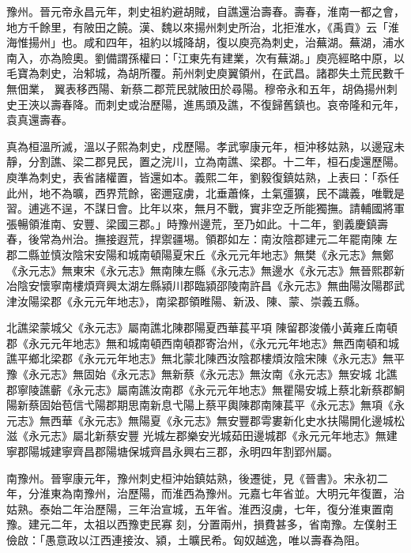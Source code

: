 \begin{pinyinscope}
 豫州。晉元帝永昌元年，刺史祖約避胡賊，自譙還治壽春。壽春，淮南一都之會，地方千餘里，有陂田之饒。漢、魏以來揚州刺史所治，北拒淮水，《禹貢》云「淮海惟揚州」也。咸和四年，祖約以城降胡，復以庾亮為刺史，治蕪湖。蕪湖，浦水南入，亦為險奧。劉備謂孫權曰：「江東先有建業，次有蕪湖。」庾亮經略中原，以毛寶為刺史，治邾城，為胡所覆。荊州刺史庾翼領州，在武昌。諸郡失土荒民數千無佃業，
 翼表移西陽、新蔡二郡荒民就陂田於尋陽。穆帝永和五年，胡偽揚州刺史王浹以壽春降。而刺史或治歷陽，進馬頭及譙，不復歸舊鎮也。哀帝隆和元年，袁真還壽春。



 真為桓溫所滅，溫以子熙為刺史，戍歷陽。孝武寧康元年，桓沖移姑熟，以邊寇未靜，分割譙、梁二郡見民，置之浣川，立為南譙、梁郡。十二年，桓石虔還歷陽。庾準為刺史，表省諸權置，皆還如本。義熙二年，劉毅復鎮姑熟，上表曰：「忝任此州，地不為曠，西界荒餘，密邇寇虜，北垂蕭條，土氣彊獷，民不識義，唯戰是習。逋逃不逞，不謀日會。比年以來，無月不戰，實非空乏所能獨撫。請輔國將軍張暢領淮南、安豐、梁國三郡。」時豫州邊荒，至乃如此。十二年，劉義慶鎮壽春，後常為州治。撫接遐荒，捍禦疆埸。領郡如左：南汝陰郡建元二年罷南陳
 左郡二縣並慎汝陰宋安陽和城南頓陽夏宋丘《永元元年地志》無樊《永元志》無鄭《永元志》無東宋《永元志》無南陳左縣《永元志》無邊水《永元志》無晉熙郡新冶陰安懷寧南樓煩齊興太湖左縣潁川郡臨潁邵陵南許昌《永元志》無曲陽汝陽郡武津汝陽梁郡《永元元年地志》，南梁郡領睢陽、新汲、陳、蒙、崇義五縣。



 北譙梁蒙城父《永元志》屬南譙北陳郡陽夏西華萇平項
 陳留郡浚儀小黃雍丘南頓郡《永元元年地志》無和城南頓西南頓郡寄治州，《永元元年地志》無西南頓和城譙平鄉北梁郡《永元元年地志》無北蒙北陳西汝陰郡樓煩汝陰宋陳《永元志》無平豫《永元志》無固始《永元志》無新蔡《永元志》無汝南《永元志》無安城
 北譙郡寧陵譙蘄《永元志》屬南譙汝南郡《永元元年地志》無瞿陽安城上蔡北新蔡郡鮦陽新蔡固始苞信弋陽郡期思南新息弋陽上蔡平輿陳郡南陳萇平《永元志》無項《永元志》無西華《永元志》無陽夏《永元志》無安豐郡雩婁新化史水扶陽開化邊城松滋《永元志》屬北新蔡安豐
 光城左郡樂安光城茹田邊城郡《永元元年地志》無建寧郡陽城建寧齊昌郡陽塘保城齊昌永興右三郡，永明四年割郢州屬。



 南豫州。晉寧康元年，豫州刺史桓沖始鎮姑熟，後遷徙，見《晉書》。宋永初二年，分淮東為南豫州，治歷陽，而淮西為豫州。元嘉七年省並。大明元年復置，治姑熟。泰始二年治歷陽，三年治宣城，五年省。淮西沒虜，七年，復分淮東置南豫。建元二年，太祖以西豫吏民寡
 刻，分置兩州，損費甚多，省南豫。左僕射王儉啟：「愚意政以江西連接汝、潁，土曠民希。匈奴越逸，唯以壽春為阻。




\end{pinyinscope}
